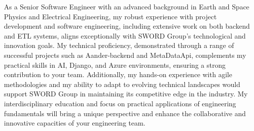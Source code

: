 
As a Senior Software Engineer with an advanced background in Earth and Space Physics and Electrical Engineering, my robust experience with project development and software engineering, including extensive work on both backend and ETL systems, aligns exceptionally with SWORD Group's technological and innovation goals.
 My technical proficiency, demonstrated through a range of successful projects such as Aander-backend and MetaDataApi, complements my practical skills in AI, Django, and Azure environments, ensuring a strong contribution to your team.
 Additionally, my hands-on experience with agile methodologies and my ability to adapt to evolving technical landscapes would support SWORD Group in maintaining its competitive edge in the industry.
 My interdisciplinary education and focus on practical applications of engineering fundamentals will bring a unique perspective and enhance the collaborative and innovative capacities of your engineering team.

